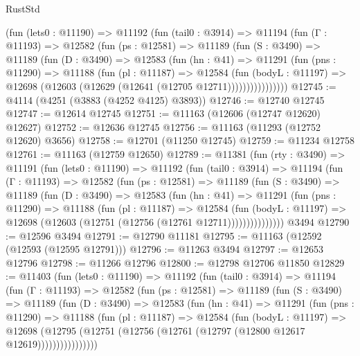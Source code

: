 \begin{lexlean}{RustStd}
\begin{coremodule}
        (fun (lets0 : @11190) =>
        @11192
          (fun (tail0 : @3914) =>
          @11194
            (fun (Γ : @11193) =>
            @12582
              (fun (ps : @12581) =>
              @11189
                (fun (S : @3490) =>
                @11189
                  (fun (D : @3490) =>
                  @12583
                    (fun (hn : @41) =>
                    @11291
                      (fun (pns : @11290) =>
                      @11188
                        (fun (pl : @11187) =>
                        @12584
                          (fun (bodyL : @11197) =>
                          @12698 (@12603 (@12629 (@12641 (@12705 @12711))))))))))))))))
@12745 := @4114 (@4251 (@3883 (@4252 @4125) @3893))
@12746 := @12740 @12745
@12747 := @12614 @12745
@12751 := @11163 (@12606 (@12747 @12620) @12627)
@12752 := @12636 @12745
@12756 := @11163 (@11293 (@12752 @12620) @3656)
@12758 := @12701 (@11250 @12745)
@12759 := @11234 @12758
@12761 := @11163 (@12759 @12650)
@12789 := @11381
    (fun (rty : @3490) =>
    @11191
      (fun (lets0 : @11190) =>
      @11192
        (fun (tail0 : @3914) =>
        @11194
          (fun (Γ : @11193) =>
          @12582
            (fun (ps : @12581) =>
            @11189
              (fun (S : @3490) =>
              @11189
                (fun (D : @3490) =>
                @12583
                  (fun (hn : @41) =>
                  @11291
                    (fun (pns : @11290) =>
                    @11188
                      (fun (pl : @11187) =>
                      @12584
                        (fun (bodyL : @11197) =>
                        @12698 (@12603 (@12751 (@12756 (@12761 @12711)))))))))))))))
    @3494
@12790 := @12596 @3494
@12791 := @12790 @11181
@12795 := @11163 (@12592 (@12593 (@12595 @12791)))
@12796 := @11263 @3494
@12797 := @12653 @12796
@12798 := @11266 @12796
@12800 := @12798 @12706 @11850
@12829 := @11403
    (fun (lets0 : @11190) =>
    @11192
      (fun (tail0 : @3914) =>
      @11194
        (fun (Γ : @11193) =>
        @12582
          (fun (ps : @12581) =>
          @11189
            (fun (S : @3490) =>
            @11189
              (fun (D : @3490) =>
              @12583
                (fun (hn : @41) =>
                @11291
                  (fun (pns : @11290) =>
                  @11188
                    (fun (pl : @11187) =>
                    @12584
                      (fun (bodyL : @11197) =>
                      @12698
                        (@12795
                          (@12751 (@12756 (@12761 (@12797 (@12800 @12617 @12619))))))))))))))))

\end{coremodule}
\end{lexlean}
